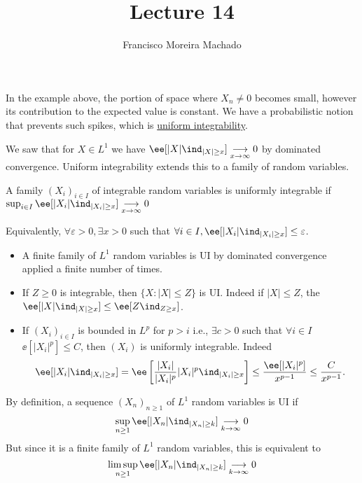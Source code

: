 \documentclass[../main.tex]{subfiles}
\author{Francisco Moreira Machado}
\title{Lecture 14}
\begin{document}
In the example above, the portion of space where $X_n \neq 0$ becomes small, 
however its contribution to the expected value is constant. We have 
a probabilistic notion that prevents such spikes, which is \underline{uniform
integrability}.

\vspace{0.5em}

\noindent
We saw that for $X \in L^1$ we have $\ee[|X| \ind_{|X| \geq x}] \underset{x \to
\infty}{\longrightarrow} 0$ by dominated convergence.
Uniform integrability extends this to a family of random variables.

\begin{definition}
  A family $(X_i)_{i \in I}$ of integrable random variables is uniformly
  integrable if $\sup_{i \in I} \ee[|X_i| \ind_{|X_i| \geq x}] \underset{x \to
  \infty}{\longrightarrow}0$
\end{definition}

Equivalently, $\forall \varepsilon > 0, \exists x > 0$ such that $\forall i \in
I, \ee[|X_i| \ind_{|X_i| \geq x}] \leq \varepsilon$.

\begin{example}
    \hfill
    \begin{itemize}
      \item A finite family of $L^1$ random variables is UI by dominated
        convergence applied a finite number of times.
      \item If $Z \geq 0$ is integrable, then $\{ X \colon |X| \leq Z \} $ is
        UI. Indeed if $|X| \leq Z$, the $\ee[|X| \ind_{|X|\geq x}] \leq \ee[Z
        \ind_{Z \geq x}]$.
      \item If $(X_i)_{i \in I}$ is bounded in $L^p$ for $p > i$ i.e., $\exists
        c>0$ such that $\forall i \in I$ $\ee[|X_i|^p] \leq C$, then $(X_i)$ is
        uniformly integrable. Indeed 
        \[
          \ee[|X_i|\ind_{|X_i| \geq x}] = 
          \ee\left[\frac{|X_i|}{|X_i|^p} |X_i|^p\ind_{|X_i| \geq x}\right] \leq
          \frac{\ee[|X_i|^p]}{x^{p-1}} \leq \frac{C}{x^{p-1}} 
        .\] 
    \end{itemize}
\end{example}

\begin{remark}
  By definition, a sequence $(X_n)_{n \geq 1}$ of $L^1$ random variables is UI
  if $$\sup_{n \geq 1} \ee[|X_n|\ind_{|X_n| \geq k}] \underset{k \to
  \infty}{\longrightarrow}0$$ But since it is a finite family of  $L^1$ random
  variables, this is equivalent to
  $$\limsup_{n \geq 1} \ee[|X_n|\ind_{|X_n| \geq k}] \underset{k \to
  \infty}{\longrightarrow}0$$
\end{remark}
\end{document}

